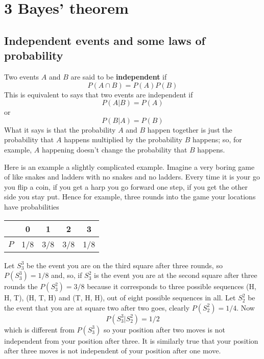 \documentclass[11pt,a4paper]{scrartcl}
\begin{document}
\section*{3 Bayes' theorem}

\subsection*{Independent events and some laws of probability}

Two events $A$ and $B$ are said to be \textbf{independent} if 
\begin{equation}
P(A\cap B)=P(A)P(B)
\end{equation}
This is equivalent to says that two events are independent if
\begin{equation}
P(A|B)=P(A)
\end{equation}
or 
\begin{equation}
P(B|A)=P(B)
\end{equation}
What it says is that the probability $A$ and $B$ happen together is
just the probability that $A$ happens multiplied by the probability
$B$ happens; so, for example, $A$ happening doesn't change the
probability that $B$ happens.


Here is an example a slightly complicated example. Imagine a very
boring game of like snakes and ladders with no snakes and no
ladders. Every time it is your go you flip a coin, if you get a harp
you go forward one step, if you get the other side you stay put. Hence for example, three
rounds into the game your locations have probabilities
\begin{center}
\begin{tabular}{c|cccc}
&0&1&2&3\\
\hline
$P$&1/8&3/8&3/8&1/8
\end{tabular}
\end{center}
Let $S_3^3$ be the event you are on the third square after three
rounds, so $P(S_3^3)=1/8$ and, so, if $S_3^2$ is the event you are at
the second square after three rounds the $P(S_3^2)=3/8$ because it
corresponds to three possible sequences (H, H, T), (H, T, H) and (T,
H, H), out of eight possible sequences in all. Let $S_2^2$ be the
event that you are at square two after two goes, clearly
$P(S_2^2)=1/4$. Now
\begin{equation}
P(S_3^3|S_2^2)=1/2
\end{equation}
which is different from $P(S_3^3)$ so your position after two moves is
not independent from your position after three. It is similarly true
that your position after three moves is not independent of your
position after one move. 
\end{document}
